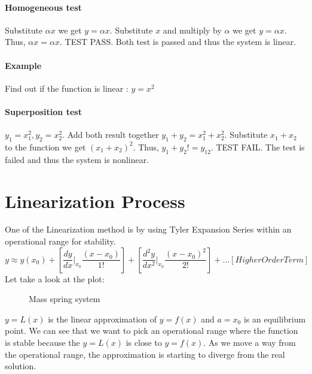 \paragraph{Homogeneous test} Substitute \(\alpha x\) we get \(y = \alpha x\).
Substitute \(x\) and multiply by \(\alpha\) we get \(y = \alpha x\). Thus, \(\alpha x=\alpha x\). TEST PASS. Both test is passed and thus the system is linear.


\paragraph{Example} Find out if the function is linear : \(y = x^2\)
\paragraph{Superposition test}\(y_1 = x_1^2, y_2 = x_2^2\). Add both result together \(y_1 + y_2 = x_1^2 + x_2^2\). Substitute \(x_1 + x_2\) to the function we get \((x_1+x_2)^2\). Thus, \(y_1+y_2!=y_{12}\). TEST FAIL. The test is failed and thus the system is nonlinear.

\section{Linearization Process}
One of the Linearization method is by using Tyler Expansion Series within an operational range for stability.
\[
y \approx y(x_0) + \left[\frac{dy}{dx}|_{x_0}\frac{(x-x_0)}{1!}\right] + \left[\frac{d^2y}{dx^2}|_{x_0}\frac{(x-x_0)^2}{2!}\right] + ... [Higher Order Term]
\]
Let take a look at the plot:

\begin{figure}[h]
\centering

\caption{Mass spring system}
\label{fig:Plot}
\end{figure}

\(y=L(x)\) is the linear approximation of \(y=f(x)\) and \(a = x_0\) is an equilibrium point. We can see that we want to pick an operational range where the function is stable because the \(y=L(x)\) is close to \(y=f(x)\). As we move a way from the operational range, the approximation is starting to diverge from the real solution.


